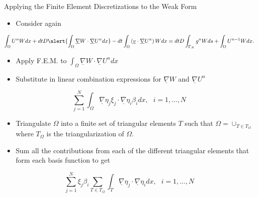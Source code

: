 \documentclass[10pt]{beamer}
\begin{document}
\begin{frame}{Applying the Finite Element Discretizations to the Weak Form}
\begin{itemize}
\item Consider again
\end{itemize}
\footnotesize
\begin{equation}
\int_{\Omega}U^{n}W dx +dtD\alert{\int_{\Omega}\underline{\nabla}W \cdot \underline{\nabla} U^{n} dx}-dt\int_{\Omega}\left(\underline{v}\cdot \underline{\nabla}U^{n}\right)W dx=dtD\int_{\Gamma_{N}}g^{n}W ds+ \int_{\Omega} U^{n-1}W dx.
\end{equation}
\normalsize
\begin{itemize}
\item Apply F.E.M. to $\int_{\Omega}\underline{\nabla}W \cdot \underline{\nabla} U^{n} dx$
\end{itemize}

\begin{itemize}
\item Substitute in linear combination expressions for $\underline{\nabla}W$ and $\underline{\nabla}U^{n}$
\end{itemize}

\begin{equation}
\sum_{j=1}^{N} \int_{\Omega} \underline{\nabla}\eta_{j} \xi_{j} \cdot \underline{\nabla}\eta_{i} \beta_{i} dx, \texttt{ } i=1,...,N
\end{equation}

\begin{itemize}
\item Triangulate $\Omega$ into a finite set of triangular elements $T$ such that $\Omega = \cup_{T \in T_{\Omega}}$ where $T_{\Omega}$ is the triangularization of $\Omega$.
\end{itemize}

\begin{itemize}
\item Sum all the contributions from each of the different triangular elements that form each basis function to get
\end{itemize}

\begin{equation}
\sum_{j=1}^{N} \xi_{j}\beta_{i}\sum_{T \in T_{\Omega}}\int_{T} \underline{\nabla} \eta_{j} \cdot \underline{\nabla}\eta_{i} dx, \texttt{ } i=1,...,N
\end{equation}
\end{frame}
\end{document}
